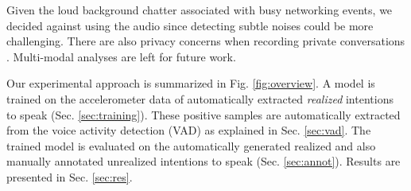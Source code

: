 \documentclass[sigconf]{acmart}
\begin{document}
Given the loud background chatter associated with busy networking events, we decided against using the audio since detecting subtle noises could be more challenging. There are also privacy concerns when recording private conversations \cite{raman2022conflab,MnM2021_underline}. Multi-modal analyses are left for future work. 
% 

Our experimental approach is summarized in Fig. \ref{fig:overview}. A model is trained on the accelerometer data of automatically extracted \emph{realized} intentions to speak (Sec. \ref{sec:training}). These positive samples are automatically extracted from the voice activity detection (VAD) as explained in Sec. \ref{sec:vad}. The trained model is evaluated on the automatically generated realized and also manually annotated unrealized intentions to speak (Sec. \ref{sec:annot}). Results are presented in Sec. \ref{sec:res}.
\end{document}
